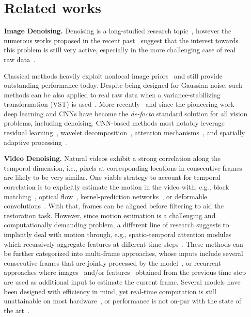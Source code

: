 \documentclass[final]{cvpr}
\begin{document}
    
    \section{Related works}
    \label{section:related}
    
    \textbf{Image Denoising.} Denoising is a long-studied research topic~\cite{buades2005review,dabov2007bm3d}, however the numerous works proposed in the recent past~\cite{zhang2017dncnn,liu2018nlrn,liu2018wcnn,chang2020spatial} suggest that the interest towards this problem is still very active, especially in the more challenging case of real raw data~\cite{brooks2019unprocessing,guo2019toward,kim2020transfer,chen2019motiondark}.

    Classical methods heavily exploit nonlocal image priors~\cite{buades2005nlm,dabov2007bm3d} and still provide outstanding performance today. Despite being designed for Gaussian noise, such methods can be also applied to real raw data when a variance-stabilizing transformation (VST) is used~\cite{makitalo2013vst}. More recently --and since the pioneering work~\cite{dong2014learning}-- deep learning and CNNs have become the \textit{de-facto} standard solution for all vision problems, including denoising. CNN-based methods most notably leverage residual learning~\cite{zhang2017dncnn}, wavelet decomposition~\cite{liu2018wcnn}, attention mechanisms~\cite{liu2018nlrn}, and spatially adaptive processing~\cite{hang2019pacnet,chang2020spatial}. 
    
    \textbf{Video Denoising.} Natural videos exhibit a strong correlation along the temporal dimension, i.e., pixels at corresponding locations in consecutive frames are likely to be very similar. One viable strategy to account for temporal correlation is to explicitly estimate the motion in the video with, e.g., block matching~\cite{maggioni2012vbm4d}, optical flow~\cite{caballero2017real,sajjadi2018frvsr}, kernel-prediction networks~\cite{mildenhall2018kpn}, or deformable convolutions~\cite{tian2020tdan,wang2019edvr}. With that, frames can be aligned before filtering to aid the restoration task. However, since motion estimation is a challenging and computationally demanding problem, a different line of research suggests to implicitly deal with motion through, e.g., spatio-temporal attention modules which recursively aggregate features at different time steps~\cite{jo2018deep,yi2019progressive,wang2019edvr,davy2019vnl}. These methods can be further categorized into multi-frame approaches, whose inputs include several consecutive frames that are jointly processed by the model~\cite{maggioni2012vbm4d,claus2019videnn,tassano2019dvdnet,tassano2020fastdvdnet,yue2020supervised}, or recurrent approaches where images~\cite{sajjadi2018frvsr,ehman2018realtime} and/or features~\cite{godart2018deep,fuoli2019rlsp} obtained from the previous time step are used as additional input to estimate the current frame. Several models have been designed with efficiency in mind, yet real-time computation is still unattainable on most hardware~\cite{fuoli2019rlsp,tassano2020fastdvdnet}, or performance is not on-par with the state of the art~\cite{ehman2018realtime}.
    
\end{document}
